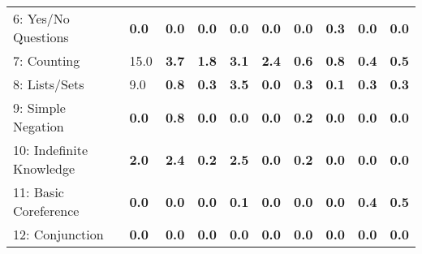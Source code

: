 \documentclass{article} \usepackage{iclr2018_conference,times}
\begin{document}
\begin{table}[t]
\begin{adjustbox}{max width=\textwidth}
\begin{tabular}{l|lllllllll}
6: Yes/No Questions                  & \textbf{0.0}                       & \textbf{0.0}                        & \textbf{0.0} & \textbf{0.0}                     & \textbf{0.0}                      & \textbf{0.0}                     & \textbf{0.3}                       & \textbf{0.0}                    & \textbf{0.0}                     \\
7: Counting                          & 15.0                      & \textbf{3.7}                       & \textbf{1.8}                         & \textbf{3.1}                     & \textbf{2.4}                      & \textbf{0.6}                    & \textbf{0.8}                        &\textbf{0.4}                &\textbf{0.5}                    \\
8: Lists/Sets                        & 9.0                       & \textbf{0.8}                        & \textbf{0.3}                         & \textbf{3.5}                     & \textbf{0.0}                     & \textbf{0.3}                     &\textbf{0.1} & \textbf{0.3}                   & \textbf{0.3}                     \\
9: Simple Negation                   & \textbf{0.0}                       & \textbf{0.8}                        & \textbf{0.0}                         & \textbf{0.0 } & \textbf{0.0}                      & \textbf{0.2}                     &\textbf{ 0.0 }                       & \textbf{0.0}                   &\textbf{0.0}                    \\
10: Indefinite Knowledge             & \textbf{2.0}                       & \textbf{2.4}                      & \textbf{0.2} &\textbf{2.5}                     & \textbf{0.0}                      & \textbf{0.2}                     & \textbf{0.0}                        & \textbf{0.0}                    & \textbf{0.0}                   \\
11: Basic Coreference                & \textbf{0.0}                       & \textbf{0.0}                        & \textbf{0.0}                         & \textbf{0.1}                    & \textbf{0.0}                      & \textbf{0.0}                     & \textbf{0.0}                        & \textbf{0.4}                  & \textbf{0.5}                    \\
12: Conjunction                      & \textbf{0.0}                       & \textbf{0.0}                        & \textbf{0.0}                         & \textbf{0.0}                     &\textbf{0.0}                      &\textbf{0.0}                     & \textbf{0.0}                        & \textbf{0.0}                   & \textbf{0.0}                     \\

\end{tabular}
\end{adjustbox}
\end{table}
\end{document}
